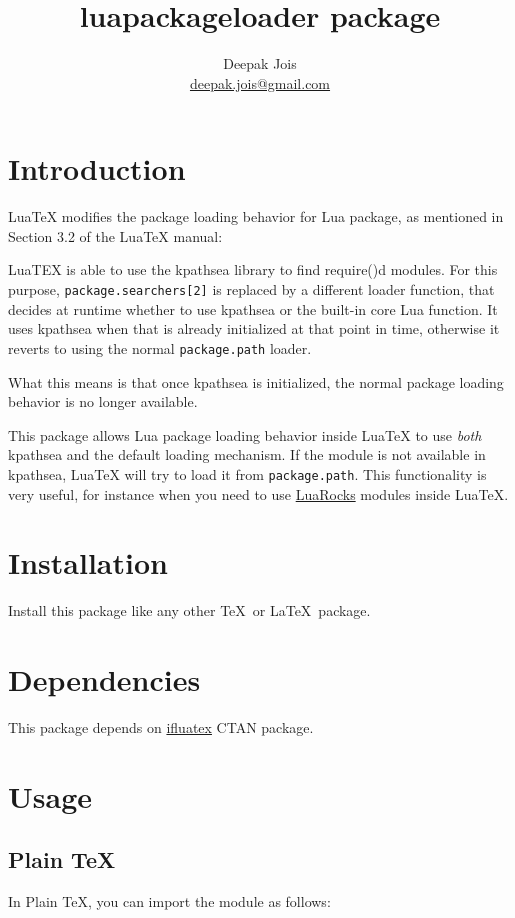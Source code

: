 \documentclass[a4paper]{article}
\title{\textsf{luapackageloader} package}
\author{Deepak Jois \\ \href{deepak.jois@gmail.com}{deepak.jois@gmail.com}}
\begin{document}
\maketitle

\section*{Introduction}
LuaTeX modifies the package loading behavior for Lua package, as mentioned in
Section 3.2 of the LuaTeX manual:

\begin{displayquote}
LuaTEX is able to use the kpathsea library to find require()d modules. For this
purpose, \texttt{package.searchers[2]} is replaced by a different loader function,
that decides at runtime whether to use kpathsea or the built-in core Lua
function. It uses kpathsea when that is already initialized at that point in
  time, otherwise it reverts to using the normal \texttt{package.path} loader.
\end{displayquote}

What this means is that once kpathsea is initialized, the normal package
loading behavior is no longer available.

This package allows Lua package loading behavior inside LuaTeX to use \textit{both}
kpathsea and the default loading mechanism. If the module is not available in kpathsea,
LuaTeX will try to load it from \texttt{package.path}. This functionality is very useful,
for instance when you need to use \href{https://luarocks.org/}{LuaRocks} modules inside LuaTeX.

\section{Installation}

Install this package like any other \TeX~or \LaTeX~package.

\section{Dependencies}

This package depends on \href{https://www.ctan.org/pkg/ifluatex}{ifluatex} CTAN package.

\section{Usage}

\subsection{Plain \TeX}
In Plain \TeX, you can import the module as follows:
\end{document}
